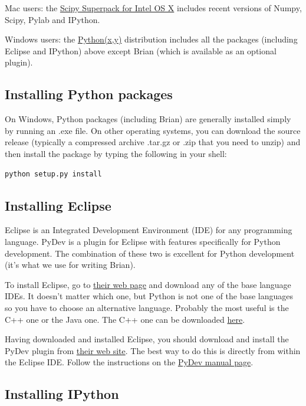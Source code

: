 \documentclass[letterpaper,10pt,english]{manual}
\begin{document}
Mac users: the \href{http://trichech.us/?page\_id=5}{Scipy Superpack for Intel OS X} includes
recent versions of Numpy, Scipy, Pylab and IPython.

Windows users: the \href{http://www.pythonxy.com/}{Python(x,y)} distribution includes all the packages
(including Eclipse and IPython) above except Brian (which is available as an optional plugin).


\subsection{Installing Python packages}

On Windows, Python packages (including Brian) are generally installed simply by running an .exe file.
On other operating systems, you can download the source release (typically a compressed
archive .tar.gz or .zip that you need to unzip) and then install the package by typing the following in your
shell:

\begin{Verbatim}[commandchars=@\[\]]
python setup.py install
\end{Verbatim}


\subsection{Installing Eclipse}

Eclipse is an Integrated Development Environment (IDE) for any programming language. PyDev is a plugin
for Eclipse with features specifically for Python development. The combination of these two is
excellent for Python development (it's what we use for writing Brian).

To install Eclipse, go to \href{http://www.eclipse.org/}{their web page} and download any of the base
language IDEs. It doesn't matter which one, but Python is not one of the base languages so you have
to choose an alternative language. Probably the most useful is the C++ one or the Java one. The C++
one can be downloaded \href{http://www.eclipse.org/cdt/downloads.php}{here}.

Having downloaded and installed Eclipse, you should download and install the PyDev plugin from
\href{http://pydev.sourceforge.net/}{their web site}. The best way to do this is directly from within
the Eclipse IDE. Follow the instructions on the \href{http://www.fabioz.com/pydev/manual\_101\_root.html}{PyDev manual page}.


\subsection{Installing IPython}
\end{document}

